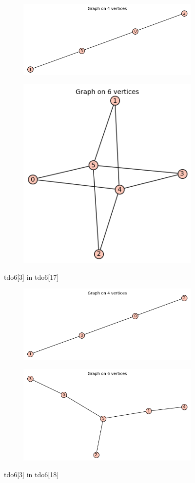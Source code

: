 \documentclass[12pt, a4paper]{article}
\begin{document}
\begin{center}
\begin{figure}[!htb]
\centering
\begin{subfigure}{0.5\textwidth}
  \centering
  \includegraphics[width=0.5\linewidth]{tdo6[3]}
\end{subfigure}%
\begin{subfigure}{0.5\textwidth}
  \centering
  \includegraphics[width=0.5\linewidth]{tdo6[17]}
\end{subfigure}
\caption{tdo6[3] in tdo6[17]}
\label{fig:test}
\end{figure}

\begin{figure}[!htb]
\centering
\begin{subfigure}{0.5\textwidth}
  \centering
  \includegraphics[width=0.6\linewidth]{tdo6[3]}
\end{subfigure}%
\begin{subfigure}{0.5\textwidth}
  \centering
  \includegraphics[width=0.6\linewidth]{tdo6[18]}
\end{subfigure}
\caption{tdo6[3] in tdo6[18]}
\label{fig:test}
\end{figure}


\end{center}
\end{document}
